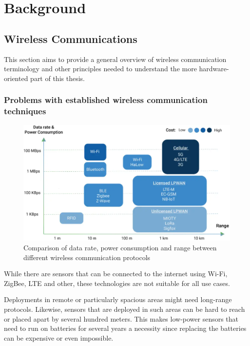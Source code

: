 \chapter{Background}

\section{Wireless Communications}

This section aims to provide a general overview of wireless communication terminology and other principles needed to understand the more hardware-oriented part of this thesis.

\subsection{Problems with established wireless communication techniques}

\begin{figure}
    \centering
    \includegraphics[width=1\textwidth]{pictures/lora/comparison-wireless-protocols.png}
    \caption{Comparison of data rate, power consumption and range between different wireless communication protocols~\protect\cite{wang_comparison_2021}}\label{pic:wireless-protocols-comparison}
\end{figure}

While there are sensors that can be connected to the internet using Wi-Fi, ZigBee, \ac{LTE} and other, these technologies are not suitable for all use cases.

Deployments in remote or particularly spacious areas might need long-range protocols.
Likewise, sensors that are deployed in such areas can be hard to reach or placed apart by several hundred meters.
This makes low-power sensors that need to run on batteries for several years a necessity since replacing the batteries can be expensive or even impossible.

